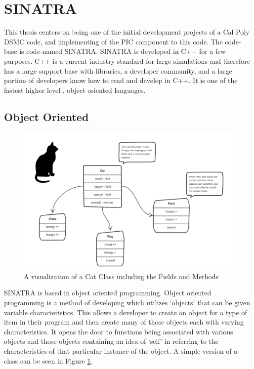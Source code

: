 \section{SINATRA}

This thesis centers on being one of the initial development projects of a Cal Poly DSMC code, and implementing of the PIC component to this code. The code-base is code-named SINATRA. SINATRA is developed in C++ for a few purposes. C++ is a current industry standard for large simulations and therefore has a large support base with libraries, a developer community, and a large portion of developers know how to read and develop in C++. It is one of the fastest higher level , object oriented languages.  

\subsection{Object Oriented}

\begin{figure}
    \centering
    \includegraphics[width=.95\textwidth]{figures/classes.png}
    \caption[A visualization of a Cat Class including the Fields and Methods]{A visualization of a Cat Class including the Fields and Methods  \cite{classes}}
    \label{fig:classes}
\end{figure}

SINATRA is based in object oriented programming. Object oriented programming is a method of developing which utilizes `objects' that can be given variable characteristics. This allows a developer to create an object for a type of item in their program and then create many of those objects each with varying characteristics. It opens the door to functions being associated with various objects and those objects containing an idea of `self' in referring to the characteristics of that particular instance of the object. A simple version of a class can be seen in Figure \ref{fig:classes}. \par

